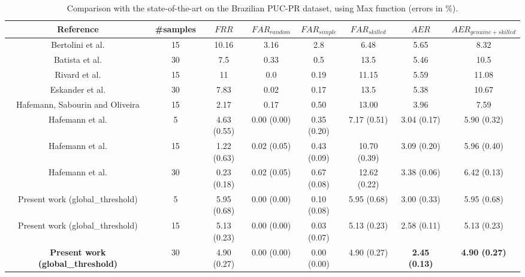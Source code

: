 \documentclass[conference]{IEEEtran}
\begin{document}
\begin{table*}[!htb]
\caption{Comparison with the state-of-the-art on the Brazilian PUC-PR dataset, using Max function (errors in \%).}
\label{tab:comparison_metrics}
\scriptsize
\centering

\begin{tabular}{cccccccc}
\hline
Reference & \#samples & $FRR$  &  $FAR_{random}$ & $FAR_{simple}$  & $FAR_{skilled}$  &  $AER$  &  $AER_{genuine+skilled}$ \\ 
\hline
Bertolini et al. \cite{bertolini:10} & 15 &  10.16  &  3.16 & 2.8  & 6.48  &  5.65 &  8.32 \\ 
Batista et al. \cite{batista:12} & 30 &  7.5  &  0.33 & 0.5  & 13.5  &  5.46 &  10.5 \\ 
Rivard et al. \cite{rivard:13} & 15  &  11  &  0.0 & 0.19  & 11.15  &  5.59 &  11.08 \\ 
Eskander et al. \cite{eskander:13} & 30 &  7.83  &  0.02 & 0.17  & 13.5  &  5.38 &  10.67 \\ 
Hafemann, Sabourin and Oliveira \cite{hafemann:16} & 15  &  2.17  &  0.17 & 0.50 & 13.00 &  3.96 & 7.59 \\ 
Hafemann et al. \cite{hafemann:17} & 5  &  4.63 (0.55)  &  0.00 (0.00) & 0.35 (0.20)  & 7.17 (0.51)  &  3.04 (0.17) &  5.90 (0.32) \\ 
Hafemann et al. \cite{hafemann:17} & 15  &  1.22 (0.63)  &  0.02 (0.05) & 0.43 (0.09) & 10.70 (0.39)  &  3.09 (0.20) &  5.96 (0.40) \\ 
Hafemann et al. \cite{hafemann:17} & 30  &  0.23 (0.18)  &  0.02 (0.05) & 0.67 (0.08)  & 12.62 (0.22)  &  3.38 (0.06) &  6.42 (0.13) \\ 
Present work (global\_threshold)  & 5 & 5.95 (0.68) & 0.00 (0.00)  & 0.10 (0.08)  & 5.95 (0.68)  &  3.00 (0.33) &  5.95 (0.68) \\ 
Present work (global\_threshold)  & 15 & 5.13 (0.23) & 0.00 (0.00)  & 0.03 (0.07)  & 5.13 (0.23)  & 2.58 (0.11)  & 5.13 (0.23)  \\ 
\textbf{Present work (global\_threshold)}  & 30 & 4.90 (0.27)  &  0.00 (0.00) & 0.00 (0.00)  & 4.90 (0.27)  &  \textbf{2.45 (0.13)} &  \textbf{4.90 (0.27)} \\ 
\hline

\end{tabular}
\end{table*}
\end{document}
